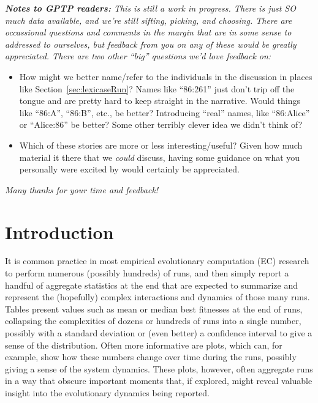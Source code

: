 \emph{\textbf{Notes to GPTP readers:} This is still a work in progress. There is just SO much
	data available, and we're still sifting, picking, and choosing. There are occassional questions 
	and comments in the margin that are in some sense to addressed to ourselves, but feedback from
	you on any of these would be greatly appreciated. There are two other ``big'' questions we'd
	love feedback on:}
\begin{itemize}
	\item How might we better name/refer to the individuals in the discussion in places like
	Section~\ref{sec:lexicaseRun}? Names like ``86:261'' just don't trip off the tongue and are
	pretty hard to keep straight in the narrative. Would things like ``86:A'', ``86:B'', etc., be
	better? Introducing ``real'' names, like ``86:Alice'' or ``Alice:86'' be better? Some other
	terribly clever idea we didn't think of?
	\item Which of these stories are more or less interesting/useful? Given how much material
	it there that we \emph{could} discuss, having some guidance on what you personally were
	excited by would certainly be appreciated.
\end{itemize}

\emph{Many thanks for your time and feedback!}

\section{Introduction}
\label{sec:introduction}

It is common practice in most empirical evolutionary computation (EC) 
research to perform numerous (possibly hundreds) of runs, and then simply 
report a handful of aggregate statistics at the end that are expected to summarize and represent 
the (hopefully) complex interactions and dynamics of those many runs. Tables present values such 
as mean or median best fitnesses at the end of runs, collapsing the complexities of dozens or 
hundreds of runs into a single number, possibly with a standard deviation or (even better) a 
confidence interval to give a sense of the distribution. Often more informative are plots, which can, 
for example, show how these numbers change over time during the runs, possibly giving a sense of 
the system dynamics. These plots, however, often aggregate runs in a way that obscure important 
moments that, if explored, might reveal valuable insight into the evolutionary dynamics being 
reported.

